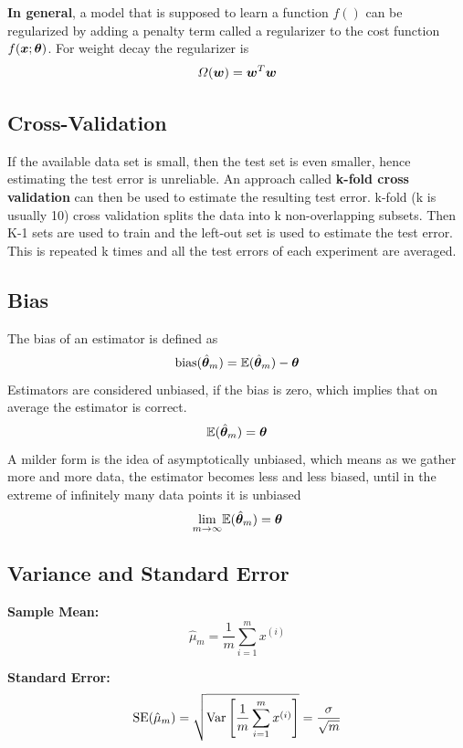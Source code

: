 \begin{multicols}{2}
	\textbf{In general}, a model that is supposed to learn a function $f()$ can be regularized by adding a penalty term called a regularizer to the cost function $f(\bol{x};\bol{\theta})$.
	For weight decay the regularizer is
	\[ \Omega(\bol{w}) = \bol{w}^T\bol{w} \]

	\subsection{Cross-Validation}
	If the available data set is small, then the test set is even smaller, hence estimating the test error is unreliable.
	An approach called \textbf{k-fold cross validation} can then be used to estimate the resulting test error.
	k-fold (k is usually 10) cross validation splits the data into k non-overlapping subsets.
	Then K-1 sets are used to train and the left-out set is used to estimate the test error.
	This is repeated k times and all the test errors of each experiment are averaged.

	\subsection{Bias}
	The bias of an estimator is defined as
	\[ \text{bias}(\hat{\bol{\theta}}_m) = \Exp (\hat{\bol{\theta}}_m)-\bol{\theta} \]
	Estimators are considered unbiased, if the bias is zero, which implies that on average the estimator is correct.
	\[ \Exp (\hat{\bol{\theta}}_m) = \bol{\theta} \]
	A milder form is the idea of asymptotically unbiased, which means as we gather more and more data, the estimator becomes less and less biased, until in the extreme of infinitely many data points it is unbiased
	\[ \underset{m\rightarrow\infty}{\lim} \Exp (\hat{\bol{\theta}}_m) = \bol{\theta} \]

%

	\subsection{Variance and Standard Error}
	\textbf{Sample Mean:}
	\[ \hat{\mu}_m = \frac{1}{m} \sum_{i=1}^{m} x^{(i)} \]

	\textbf{Standard Error:}
	\[ \text{SE}(\hat{\mu}_m) = \sqrt{\text{Var}\left[\frac{1}{m}\sum_{i=1}^{m}x^{(i)}\right]}
	= \frac{\sigma}{\sqrt{m}} \]


\end{multicols}
